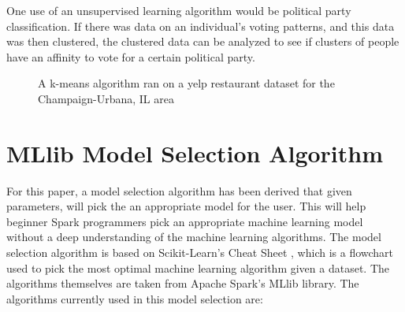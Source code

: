 \documentclass[9pt,twocolumn,twoside]{idsi}
\begin{document}
One use of an unsupervised learning algorithm would be political party classification. If there was data on an individual's voting patterns, and this data was then clustered, the clustered data can be analyzed to see if clusters of people have an affinity to vote for a certain political party. 
\begin{figure}[htbp]
\centering{}
\caption{A k-means algorithm ran on a yelp restaurant dataset for the Champaign-Urbana, IL area}
\label{fig:KMeans}
\end{figure}



\section{MLlib Model Selection Algorithm} \label{algo}
For this paper, a model selection algorithm has been derived that given parameters, will pick the an appropriate model for the user. This will help beginner Spark programmers pick an appropriate machine learning model without a deep understanding of the machine learning algorithms. The model selection algorithm is based on Scikit-Learn's Cheat Sheet \cite{scikit_learn}, which is a flowchart used to pick the most optimal machine learning algorithm given a dataset. The algorithms themselves are taken from Apache Spark's MLlib library. The algorithms currently used in this model selection are:
\end{document}
